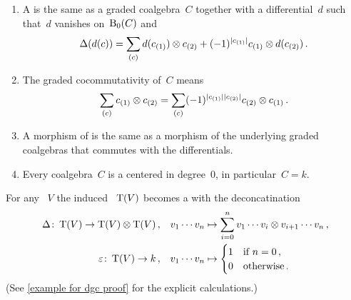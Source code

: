 \documentclass[a4paper,10pt,headings=standardclasses]{scrartcl}
\begin{document}

\begin{remark}
  \leavevmode
  \begin{enumerate}
    \item
      A {\dgc} is the same as a graded coalgebra~$C$ together with a differential~$d$ such that~$d$ vanishes on~$\operatorname{B}_0(C)$ and
      \[
        \Delta(d(c))
        =
        \sum_{(c)}
        d(c_{(1)}) \otimes c_{(2)}
        + (-1)^{\lvert c_{(1)}\rvert} c_{(1)} \otimes d(c_{(2)}) \,.
      \]
    \item
      The graded cocommutativity of~$C$ means
      \[
        \sum_{(c)} c_{(1)} \otimes c_{(2)}
        =
        \sum_{(c)} (-1)^{\lvert c_{(1)}\rvert \lvert c_{(2)}\rvert} c_{(2)} \otimes c_{(1)} \,.
      \]
    \item
      A morphism of {\dgcs} is the same as a morphism of the underlying graded coalgebras that commutes with the differentials.
    \item
      Every coalgebra~$C$ is a {\dgc} centered in degree~$0$, in particular~$C = k$.
  \end{enumerate}
\end{remark}

\begin{example}
  \label{example for dgc}
  For any {\dgv}~$V$ the induced {\dgv}~$\operatorname{T}(V)$ becomes a {\dgc} with the deconcatination
  \begin{align*}
    \Delta
    \colon
    \operatorname{T}(V)
    \to
    \operatorname{T}(V) \otimes \operatorname{T}(V) \,,
    \quad
    &v_1 \dotsm v_n
    \mapsto
    \sum_{i=0}^n
    v_1 \dotsm v_i \otimes v_{i+1} \dotsm v_n \,,
  \\
    \varepsilon
    \colon
    \operatorname{T}(V)
    \to
    k \,,
    \quad
    &v_1 \dotsm v_n
    \mapsto
    \begin{cases}
      1 & \text{if~$n = 0$} \,, \\
      0 & \text{otherwise} \,.
    \end{cases}
  \end{align*}
  (See \cref{example for dgc proof} for the explicit calculations.)
\end{example}
\end{document}
